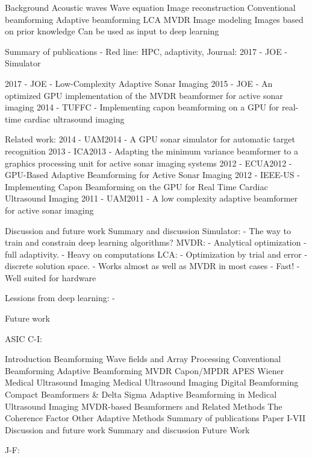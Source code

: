       
Background
   Acoustic waves
      Wave equation
   Image reconstruction
      Conventional beamforming
      Adaptive beamforming
         LCA
         MVDR
   Image modeling
      Images based on prior knowledge
      Can be used as input to deep learning
      

Summary of publications
   - Red line: HPC, adaptivity,
   Journal:
      2017 - JOE - Simulator
               
      2017 - JOE - Low-Complexity Adaptive Sonar Imaging
      2015 - JOE - An optimized GPU implementation of the MVDR beamformer for active sonar imaging
      2014 - TUFFC - Implementing capon beamforming on a GPU for real-time cardiac ultrasound imaging 
      
   Related work:
      2014 - UAM2014 - A GPU sonar simulator for automatic target recognition
      2013 - ICA2013 - Adapting the minimum variance beamformer to a graphics processing unit for active sonar imaging systems
      2012 - ECUA2012 - GPU-Based Adaptive Beamforming for Active Sonar Imaging
      2012 - IEEE-US - Implementing Capon Beamforming on the GPU for Real Time Cardiac Ultrasound Imaging
      2011 - UAM2011 - A low complexity adaptive beamformer for active sonar imaging

Discussion and future work
   Summary and discussion
      Simulator:
      - The way to train and constrain deep learning algorithms?
      MVDR:
      - Analytical optimization - full adaptivity.
      - Heavy on computations
      LCA:
      - Optimization by trial and error - discrete solution space.
      - Works almost as well as MVDR in most cases
      - Fast!
      - Well suited for hardware
      
      Lessions from deep learning:
      - 
      
   Future work
   

\gls{ASIC}
C-I:

Introduction
   Beamforming
   Wave fields and Array Processing
   Conventional Beamforming
   Adaptive Beamforming
      MVDR
      Capon/MPDR
      APES
      Wiener
   Medical Ultrasound Imaging
   Medical Ultrasound Imaging
   Digital Beamforming
      Compact Beamformers \& Delta Sigma
      Adaptive Beamforming in Medical Ultrasound Imaging
         MVDR-based Beamformers and Related Methods
         The Coherence Factor
         Other Adaptive Methods
Summary of publications
   Paper I-VII
Discussion and future work
   Summary and discussion
   Future Work

   
J-F:

